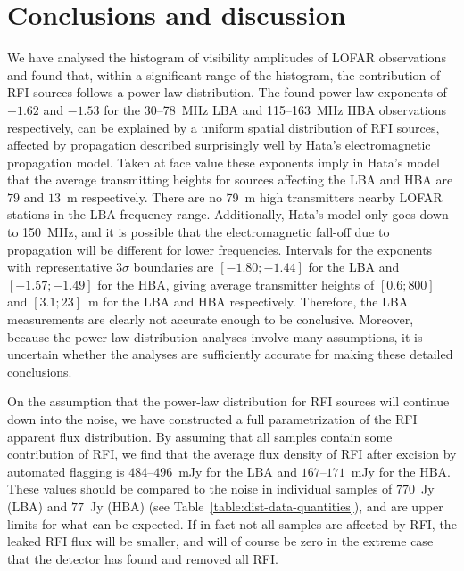 \documentclass[useAMS,usenatbib]{mn2e}
\begin{document}
\section{Conclusions and discussion} \label{sec:dist-discussion}
We have analysed the histogram of visibility amplitudes of LOFAR observations and found that, within a significant range of the histogram, the contribution of RFI sources follows a power-law distribution. The found power-law exponents of $-1.62$ and $-1.53$ for the 30--78~MHz LBA and 115--163~MHz HBA observations respectively, can be explained by a uniform spatial distribution of RFI sources, affected by propagation described surprisingly well by Hata's electromagnetic propagation model. Taken at face value these exponents imply in Hata's model that the average transmitting heights for sources affecting the LBA and HBA are $79$ and $13$~m respectively. There are no 79~m high transmitters nearby LOFAR stations in the LBA frequency range. Additionally, Hata's model only goes down to 150~MHz, and it is possible that the electromagnetic fall-off due to propagation will be different for lower frequencies. Intervals for the exponents with representative $3\sigma$ boundaries are $[-1.80;-1.44]$ for the LBA and $[-1.57;-1.49]$ for the HBA, giving average transmitter heights of $[0.6; 800]$ and $[3.1; 23]$~m for the LBA and HBA respectively. Therefore, the LBA measurements are clearly not accurate enough to be conclusive. Moreover, because the power-law distribution analyses involve many assumptions, it is uncertain whether the analyses are sufficiently accurate for making these detailed conclusions.

On the assumption that the power-law distribution for RFI sources will continue down into the noise, we have constructed a full parametrization of the RFI apparent flux distribution. By assuming that all samples contain some contribution of RFI, we find that the average flux density of RFI after excision by automated flagging is $484$--$496$~mJy for the LBA and $167$--$171$~mJy for the HBA. These values should be compared to the noise in individual samples of $770$~Jy (LBA) and $77$~Jy (HBA) (see Table~\ref{table:dist-data-quantities}), and are upper limits for what can be expected. If in fact not all samples are affected by RFI, the leaked RFI flux will be smaller, and will of course be zero in the extreme case that the detector has found and removed all RFI.
\end{document}
